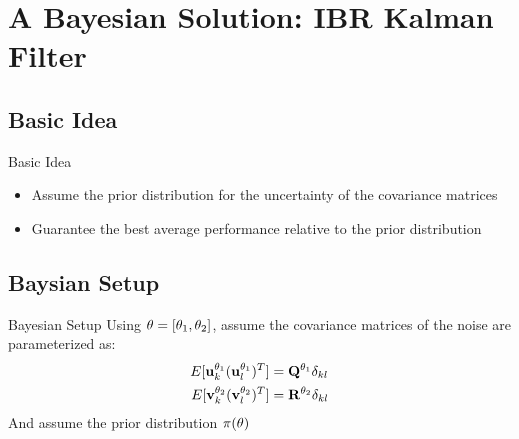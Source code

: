 \section{A Bayesian Solution: IBR Kalman Filter}
\begin{frame}
    \tableofcontents[currentsection]
\end{frame}

\subsection{Basic Idea}
\begin{frame}{Basic Idea}
    \begin{itemize}
        \item Assume the prior distribution for the uncertainty of the covariance matrices
        \item Guarantee the best average performance relative to the prior distribution
    \end{itemize}
\end{frame}

\subsection{Baysian Setup}
\begin{frame}{Bayesian Setup}
Using ${\bf \theta}=[\theta_1, \theta_2]$, assume the covariance matrices of the noise are parameterized as: 
\begin{align*}
E[{\bf u}^{\theta_1}_k ({\bf u}^{\theta_1}_l)^T]&={\bf Q}^{\theta_1}\delta_{kl}\\
E[{\bf v}^{\theta_2}_k ({\bf v}^{\theta_2}_l)^T]&={\bf R}^{\theta_2}\delta_{kl}
\end{align*}
And assume the prior distribution $\pi({\bf \theta})$
\end{frame}

